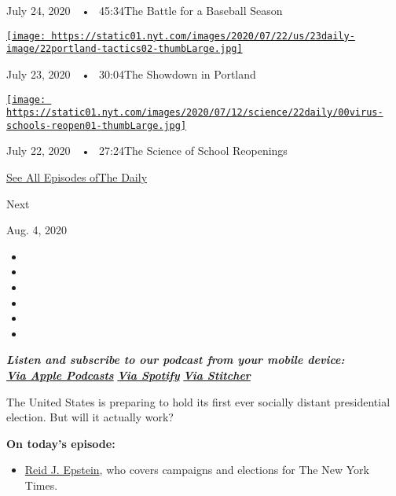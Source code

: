 July 24, 2020~~•~ 45:34The Battle for a Baseball Season

\href{https://www.nytimes.com/2020/07/23/podcasts/the-daily/portland-protests.html?action=click\&module=audio-series-bar\&region=header\&pgtype=Article}{\texttt{[image: https://static01.nyt.com/images/2020/07/22/us/23daily-image/22portland-tactics02-thumbLarge.jpg]}}

July 23, 2020~~•~ 30:04The Showdown in Portland

\href{https://www.nytimes.com/2020/07/22/podcasts/the-daily/school-reopenings-coronavirus.html?action=click\&module=audio-series-bar\&region=header\&pgtype=Article}{\texttt{[image: https://static01.nyt.com/images/2020/07/12/science/22daily/00virus-schools-reopen01-thumbLarge.jpg]}}

July 22, 2020~~•~ 27:24The Science of School Reopenings

\href{https://www.nytimes.com/column/the-daily}{See All Episodes ofThe
Daily}

Next

Aug. 4, 2020

\begin{itemize}
\item
\item
\item
\item
\item
\item
\end{itemize}

\emph{\textbf{Listen and subscribe to our podcast from your mobile
device:}}\\
\textbf{\href{https://itunes.apple.com/us/podcast/the-daily/id1200361736?mt=2}{\emph{Via
Apple Podcasts}}} \emph{\textbf{\textbar{}}}
\textbf{\href{https://open.spotify.com/show/3IM0lmZxpFAY7CwMuv9H4g?si=SfuMSC55R1qprFsRZU3_zw}{\emph{Via
Spotify}}} \emph{\textbf{\textbar{}}}
\textbf{\href{http://www.stitcher.com/podcast/the-new-york-times/the-daily-10}{\emph{Via
Stitcher}}}

The United States is preparing to hold its first ever socially distant
presidential election. But will it actually work?

\textbf{On today's episode:}

\begin{itemize}
\tightlist
\item
  \href{https://www.nytimes.com/by/reid-j-epstein}{Reid J. Epstein}, who
  covers campaigns and elections for The New York Times.
\end{itemize}

